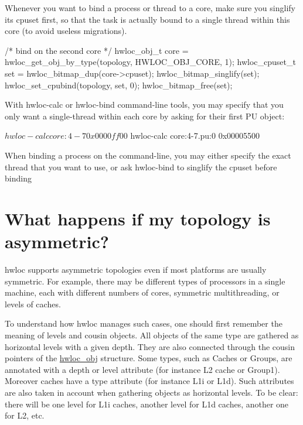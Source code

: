 Whenever you want to bind a process or thread to a core, make sure you singlify its cpuset first, so that the task is actually bound to a single thread within this core (to avoid useless migrations). \begin{DoxyVerb}
/* bind on the second core */
hwloc_obj_t core = hwloc_get_obj_by_type(topology, HWLOC_OBJ_CORE, 1);
hwloc_cpuset_t set = hwloc_bitmap_dup(core->cpuset);
hwloc_bitmap_singlify(set);
hwloc_set_cpubind(topology, set, 0);
hwloc_bitmap_free(set);
\end{DoxyVerb}


With hwloc-\/calc or hwloc-\/bind command-\/line tools, you may specify that you only want a single-\/thread within each core by asking for their first PU object: \begin{DoxyVerb}
$ hwloc-calc core:4-7
0x0000ff00
$ hwloc-calc core:4-7.pu:0
0x00005500
\end{DoxyVerb}


When binding a process on the command-\/line, you may either specify the exact thread that you want to use, or ask hwloc-\/bind to singlify the cpuset before binding 
\hypertarget{a00011_faq_asymmetric}{}\section{What happens if my topology is asymmetric?}\label{a00011_faq_asymmetric}
hwloc supports asymmetric topologies even if most platforms are usually symmetric. For example, there may be different types of processors in a single machine, each with different numbers of cores, symmetric multithreading, or levels of caches.

To understand how hwloc manages such cases, one should first remember the meaning of levels and cousin objects. All objects of the same type are gathered as horizontal levels with a given depth. They are also connected through the cousin pointers of the \hyperlink{a00016}{hwloc\_\-obj} structure. Some types, such as Caches or Groups, are annotated with a depth or level attribute (for instance L2 cache or Group1). Moreover caches have a type attribute (for instance L1i or L1d). Such attributes are also taken in account when gathering objects as horizontal levels. To be clear: there will be one level for L1i caches, another level for L1d caches, another one for L2, etc.

